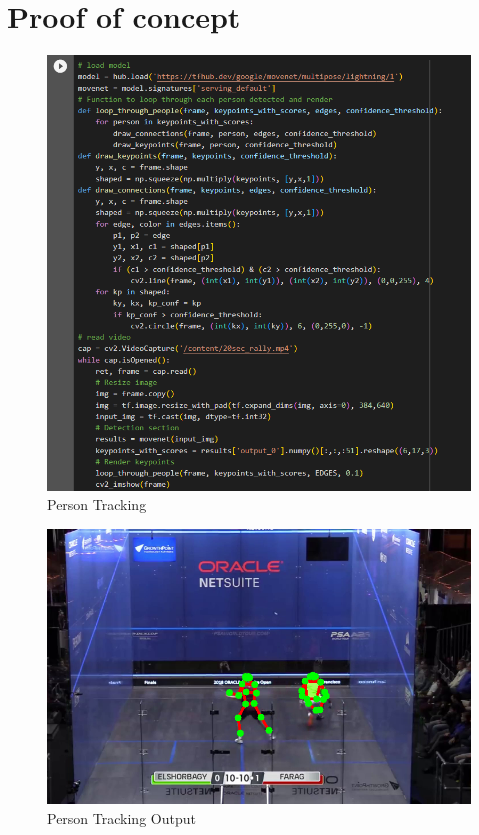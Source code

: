 \documentclass[12pt]{article}
\begin{document}
\section{Proof of concept}
    \begin{figure}[H]
        \centering
        \includegraphics[width=1\linewidth]{figures/humen-pose-code.png}
        \caption{Person Tracking}
        \label{fig:person tracking}
    \end{figure}
    \begin{figure}[H]
        \centering
        \includegraphics[width=1\linewidth]{figures/humen-pose-output.png}
        \caption{Person Tracking Output}
        \label{fig:peson tracking output}
    \end{figure}
\end{document}
